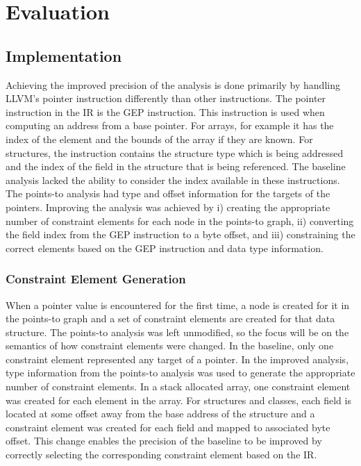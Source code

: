\section{Evaluation}
\subsection{Implementation}

Achieving the improved precision of the analysis is done primarily by
handling LLVM's pointer instruction differently than other instructions. The
pointer instruction in the IR is the GEP instruction. This instruction
is used when computing an address from a base pointer. For arrays, for example
it has the index of the element and the bounds of the array if they are known.
For structures, the instruction contains the structure type which is being
addressed and the index of the field in the structure that is being referenced.
The baseline analysis lacked the ability to consider the index available in
these instructions. The points-to analysis had type and offset
information for the targets of the pointers. Improving the analysis was achieved
by i) creating the appropriate number of constraint elements for each node in
the points-to graph, ii) converting the field index from the GEP instruction to
a byte offset, and iii) constraining the correct elements based on
the GEP instruction and data type information.

\subsubsection{Constraint Element Generation}
When a pointer value is encountered for the first time, a node is created for it
in the points-to graph and a set of constraint elements are created for that
data structure. The points-to analysis was left unmodified, so the focus will be
on the semantics of how constraint elements were changed. In the baseline, only
one constraint element represented any target of a pointer. In the improved
analysis, type information from the points-to analysis was used to generate the
appropriate number of constraint elements. In a stack allocated array, one
constraint element was created for each element in the array. For structures and
classes, each field is located at some offset away from the base address of the
structure and a constraint element was created for each field and mapped to
associated byte offset. This change enables the precision of the baseline to be
improved by correctly selecting the corresponding constraint element based on
the IR.


